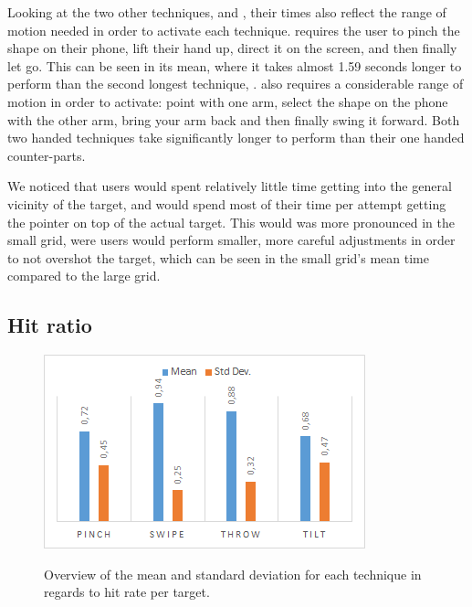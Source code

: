 Looking at the two other techniques, \pinch and \throw, their times also reflect the range of motion needed in order to activate each technique. \pinch requires the user to pinch the shape on their phone, lift their hand up, direct it on the screen, and then finally let go. This can be seen in its mean, where it takes almost 1.59 seconds longer to perform than the second longest technique, \throw. \throw also requires a considerable range of motion in order to activate: point with one arm, select the shape on the phone with the other arm, bring your arm back and then finally swing it forward. Both two handed techniques take significantly longer to perform than their one handed counter-parts.

We noticed that users would spent relatively little time getting into the general vicinity of the target, and would spend most of their time per attempt getting the pointer on top of the actual target. This would was more pronounced in the small grid, were users would perform smaller, more careful adjustments in order to not overshot the target, which can be seen in the small grid's mean time compared to the large grid.
\subsection{Hit ratio}
\begin{figure}[H]
	{\includegraphics[width = 1\columnwidth ]{images/techHitResults.png}} 
	\caption{
		Overview of the mean and standard deviation for each technique in regards to hit rate per target.
	}
	\label{fig:gridhitResults}
\end{figure}

